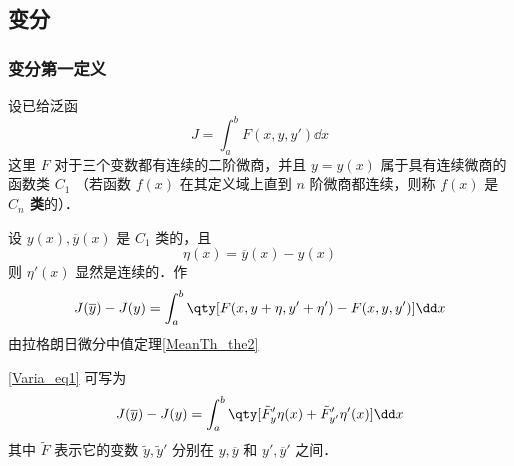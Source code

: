 \subsection{变分}\label{Varia_sub1}
\subsubsection{变分第一定义}
设已给泛函
\begin{equation}
J=\int_a^b F(x,y,y')\dd x
\end{equation}
这里 $F$ 对于三个变数都有连续的二阶微商，并且 $y=y(x)$ 属于具有连续微商的函数类 $C_1$ （若函数 $f(x)$ 在其定义域上直到 $n$ 阶微商都连续，则称 $f(x)$ 是\textbf{ $C_n$ 类}的）．

设 $y(x),\overline{y}(x)$ 是 $C_1$ 类的，且
\begin{equation}
\eta(x)=\overline{y}(x)-y(x)
\end{equation}
则 $\eta'(x)$ 显然是连续的．作
\begin{equation}\label{Varia_eq1}
J(\overline{y})-J(y)=\int_a^b\qty[F(x,y+\eta,y'+\eta')-F(x,y,y')]\dd x
\end{equation}
由拉格朗日微分中值定理\autoref{MeanTh_the2}~
\begin{issues}
\end{issues}
\autoref{Varia_eq1} 可写为
\begin{equation}
J(\overline{y})-J(y)=\int_a^b\qty[\tilde{F}'_y\eta(x)+\tilde{F}'_{y'}\eta'(x)]\dd x
\end{equation}
其中 $\tilde{F}$ 表示它的变数 $\tilde{y},\tilde{y}'$ 分别在 $y,\overline{y}$ 和 $y',\overline{y}'$ 之间．

